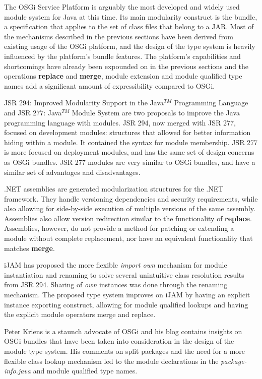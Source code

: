 The OSGi Service Platform \cite{OSGi4} is arguably the most developed and
widely used module system for Java at this time. Its main modularity 
construct is the bundle, a specification that applies to the set of class
files that belong to a JAR. Most of the mechanisms
described in the previous sections have been derived from existing usage
of the OSGi platform, and the design of the type system is heavily
influenced by the platform's bundle features. The platform's
capabilities and shortcomings have already been expounded on in the 
previous sections and the operations \textbf{replace} and \textbf{merge},
module extension and module qualified type names add a significant amount of expressibility compared
to OSGi.

JSR 294: Improved Modularity Support in the Java$^{TM}$ Programming Language \cite{JSR294} and
JSR 277: Java$^{TM}$ Module System \cite{JSR277} are two proposals to improve
the Java programming language with modules. JSR 294, now merged with JSR 277, focused
on development modules: structures that allowed for better information hiding within 
a module. It contained the syntax for module membership.
JSR 277 is more focused on deployment modules, and has the same set of design 
concerns as OSGi bundles. JSR 277 modules are very similar to OSGi bundles,
and have a similar set of advantages and disadvantages.

.NET assemblies \cite{netassemblies} are generated modularization structures
for the .NET framework. They handle versioning dependencies and security
requirements, while also allowing for side-by-side execution of multiple
versions of the same assembly. Assemblies also allow version redirection
similar to the functionality of \textbf{replace}. Assemblies, however,
do not provide a method for patching or extending a module without 
complete replacement, nor have an equivalent functionality that matches
\textbf{merge}.

iJAM \cite{iJAM} has proposed the more flexible \textit{import own}
mechanism for module instantiation and renaming to solve several unintuitive class
resolution results from JSR 294. Sharing of \textit{own} instances was
done through the renaming mechanism. The proposed type system improves
on iJAM by having an explicit instance exporting construct,
allowing for module qualified lookups and having the explicit module operators
merge and replace.

Peter Kriens is a staunch advocate of OSGi and his blog \cite{iJAMComments, superpackagesNoMore}
contains insights on OSGi bundles that have been taken into consideration
in the design of the module type system. His comments on split packages and
the need for a more flexible class lookup mechanism led to the module declarations
in the \textit{package-info.java} and module qualified type names.

